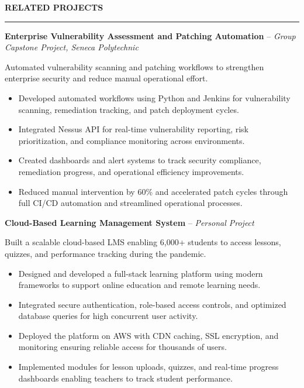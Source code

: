 \documentclass[10pt,letterpaper]{article}
\begin{document}
\vspace{6pt}

\textbf{RELATED PROJECTS}\\[-8pt]
\noindent\rule{\textwidth}{1pt}

\vspace{-2pt}

\textbf{Enterprise Vulnerability Assessment and Patching Automation} -- \emph{Group Capstone Project, Seneca Polytechnic }

\vspace{-1pt}

Automated vulnerability scanning and patching workflows to strengthen enterprise security and reduce manual operational effort.
\vspace{-1pt}
\begin{itemize}
\item Developed automated workflows using Python and Jenkins for vulnerability scanning, remediation tracking, and patch deployment cycles.
\item Integrated Nessus API for real-time vulnerability reporting, risk prioritization, and compliance monitoring across environments.
\item Created dashboards and alert systems to track security compliance, remediation progress, and operational efficiency improvements.
\item Reduced manual intervention by 60\% and accelerated patch cycles through full CI/CD automation and streamlined operational processes.
\end{itemize}

\textbf{Cloud-Based Learning Management System} -- \emph{Personal Project}

\vspace{-1pt}

Built a scalable cloud-based LMS enabling 6,000+ students to access lessons, quizzes, and performance tracking during the pandemic.
\vspace{-1pt}
\begin{itemize}
\item Designed and developed a full-stack learning platform using modern frameworks to support online education and remote learning needs.
\item Integrated secure authentication, role-based access controls, and optimized database queries for high concurrent user activity.
\item Deployed the platform on AWS with CDN caching, SSL encryption, and monitoring ensuring reliable access for thousands of users.
\item Implemented modules for lesson uploads, quizzes, and real-time progress dashboards enabling teachers to track student performance.
\end{itemize}
\end{document}
